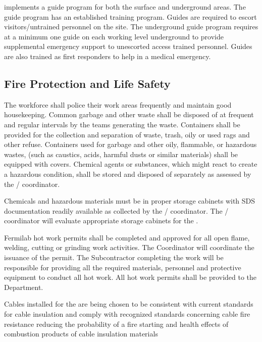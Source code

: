  implements a guide program for both the surface and underground
areas. The guide program has an established training program. Guides
are required to escort visitors/untrained personnel on the 
site. The underground guide program requires at a minimum one guide on
each working level underground to provide supplemental emergency
support to unescorted access trained personnel. Guides are also
trained as first responders to help in a medical emergency.

\subsection{Fire Protection and Life Safety}

The workforce shall police their work areas frequently and maintain
good housekeeping. Common garbage and other waste shall be disposed of
at frequent and regular intervals by the teams generating the
waste. Containers shall be provided for the collection and separation
of waste, trash, oily or used rags and other refuse.  Containers used
for garbage and other oily, flammable, or hazardous wastes, (such as
caustics, acids, harmful dusts or similar materials) shall be equipped
with covers.  Chemical agents or substances, which might react to
create a hazardous condition, shall be stored and disposed of
separately as assessed by the / 
coordinator.

Chemicals and hazardous materials must be in proper storage cabinets
with SDS documentation readily available as collected by the
/  coordinator. The
/  coordinator will evaluate
appropriate storage cabinets for the .

Fermilab hot work permits shall be completed and approved for all open
flame, welding, cutting or grinding work activities.  The 
 Coordinator will coordinate the issuance of the permit.
The Subcontractor completing the work will be responsible for
providing all the required materials, personnel and protective
equipment to conduct all hot work. All hot work permits shall be
provided to the   Department.

Cables installed for the  are being chosen to be
consistent with current \fnal standards for cable insulation and
comply with recognized standards concerning cable fire resistance
reducing the probability of a fire starting and health effects of
combustion products of cable insulation materials

